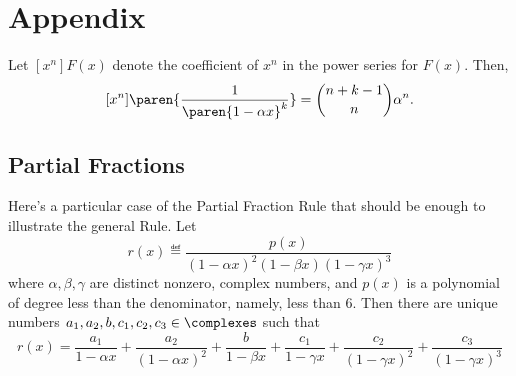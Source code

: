 \documentclass[handout]{mcs}
\begin{document}




\examspace
\section*{Appendix}
Let $[x^n]F(x)$ denote the coefficient of $x^n$ in the power series
for $F(x)$.  Then,
\[
[x^n]\paren{\frac{1}{\paren{1-\alpha x}^k}} = \binom{n+k-1}{n}\alpha^n.
\]

\subsection*{Partial Fractions}

Here's a particular case of the Partial Fraction Rule that should be
enough to illustrate the general Rule.  Let
\[
r(x) \eqdef \frac{p(x)}{(1-\alpha x)^2 (1-\beta x) (1-\gamma x)^3}
\]
where $\alpha, \beta, \gamma$ are distinct nonzero, complex numbers,
and $p(x)$ is a polynomial of degree less than the denominator,
namely, less than 6.  Then there are unique numbers
$a_1,a_2,b,c_1,c_2,c_3 \in \complexes$ such that
\[
r(x)
= \frac{a_1}{1-\alpha x} + \frac{a_2}{(1-\alpha x)^2}
+ \frac{b}{1-\beta x}
+ \frac{c_1}{1-\gamma x} + \frac{c_2}{(1-\gamma x)^2} + \frac{c_3}{(1-\gamma x)^3}
\]

\iffalse Explain why partial fractions together with~\eqref{1axk} imply
that there is a closed form expression (allowing binomial coefficients)
for $[x^n]\paren{R(x)/S(x)}$ for arbitrary polynomials $R(x),S(x)$.
\fi

\end{document}
